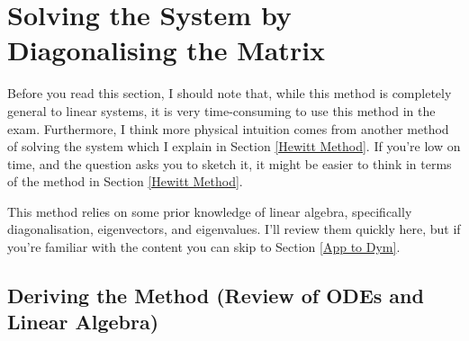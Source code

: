 \section{Solving the System by Diagonalising the Matrix}

Before you read this section, I should note that, while this method is completely general to linear systems, it is very time-consuming to use this method in the exam. Furthermore, I think more physical intuition comes from another method of solving the system which I explain in Section \ref{Hewitt Method}. If you're low on time, and the question asks you to sketch it, it might be easier to think in terms of the method in Section \ref{Hewitt Method}.

This method relies on some prior knowledge of linear algebra, specifically diagonalisation, eigenvectors, and eigenvalues. I'll review them quickly here, but if you're familiar with the content you can skip to Section \ref{App to Dym}. 

\subsection{Deriving the Method (Review of ODEs and Linear Algebra)}
